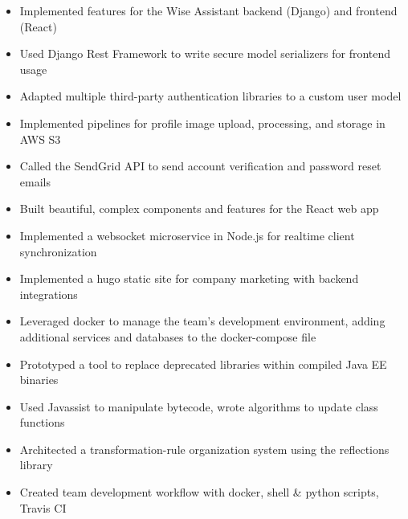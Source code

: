\documentclass[]{rcf_cv}
\begin{document}
		
		\begin{itemize}
			\setlength\itemsep{-0.4em}
			\renewcommand\labelitemi{--}
		
			\item Implemented features for the Wise Assistant backend (Django) and frontend (React)
			\item Used Django Rest Framework to write secure model serializers for frontend usage
			\item Adapted multiple third-party authentication libraries to a custom user model
			\item Implemented pipelines for profile image upload, processing, and storage in AWS S3
			\item Called the SendGrid API to send account verification and password reset emails
			\item Built beautiful, complex components and features for the React web app
			\item Implemented a websocket microservice in Node.js for realtime client synchronization
			\item Implemented a hugo static site for company marketing with backend integrations
			\item Leveraged docker to manage the team's development environment, adding additional services and databases to the docker-compose file

		\end{itemize}
	
		\begin{itemize}
			\setlength\itemsep{-0.4em}
			\renewcommand\labelitemi{--}
			
			\item Prototyped a tool to replace deprecated libraries within compiled Java EE binaries
			\item Used Javassist to manipulate bytecode, wrote algorithms to update class functions
			\item Architected a transformation-rule organization system using the reflections library
			\item Created team development workflow with docker, shell \& python scripts, Travis CI

		\end{itemize}
	
\end{document}

